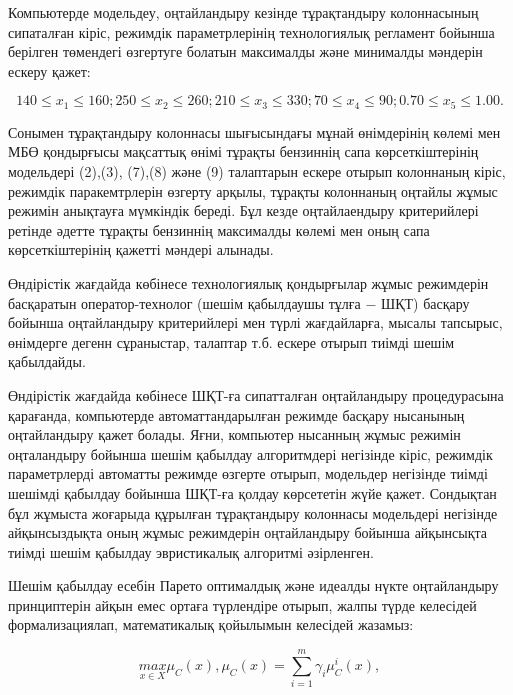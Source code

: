 \begin{multicols}{2}
Компьютерде модельдеу, оңтайландыру кезінде тұрақтандыру колоннасының
сипаталған кіріс, режимдік параметрлерінің технологиялық регламент
бойынша берілген төмендегі өзгертуге болатын максималды және минималды
мәндерін ескеру қажет:
\end{multicols}

\begin{equation}
140\leq x_1 \leq 160;250\leq x_2\leq 260;210\leq x_3\leq 330;70\leq x_4\leq 90;0.70\leq x_5\leq 1.00.
\end{equation}

\begin{multicols}{2}
Сонымен тұрақтандыру колоннасы шығысындағы мұнай өнімдерінің көлемі мен
МБӨ қондырғысы мақсаттық өнімі тұрақты бензиннің сапа көрсеткіштерінің
модельдері (2),(3), (7),(8) және (9) талаптарын ескере отырып колоннаның
кіріс, режимдік паракемтрлерін өзгерту арқылы, тұрақты колоннаның
оңтайлы жұмыс режимін анықтауға мүмкіндік береді. Бұл кезде
оңтайлаендыру критерийлері ретінде әдетте тұрақты бензиннің максималды
көлемі мен оның сапа көрсеткіштерінің қажетті мәндері алынады.

Өндірістік жағдайда көбінесе технологиялық қондырғылар жұмыс режимдерін
басқаратын оператор-технолог (шешім қабылдаушы тұлға − ШҚТ) басқару
бойынша оңтайландыру критерийлері мен түрлі жағдайларға, мысалы
тапсырыс, өнімдерге дегенн сұраныстар, талаптар т.б. ескере отырып
тиімді шешім қабылдайды.

Өндірістік жағдайда көбінесе ШҚТ-ға сипатталған оңтайландыру
процедурасына қарағанда, компьютерде автоматтандарылған режимде басқару
нысанының оңтайландыру қажет болады. Яғни, компьютер нысанның жұмыс
режимін оңталандыру бойынша шешім қабылдау алгоритмдері негізінде кіріс,
режимдік параметрлерді автоматты режимде өзгерте отырып, модельдер
негізінде тиімді шешімді қабылдау бойынша ШҚТ-ға қолдау көрсететін жүйе
қажет. Сондықтан бұл жұмыста жоғарыда құрылған тұрақтандыру колоннасы
модельдері негізінде айқынсыздықта оның жұмыс режимдерін оңтайландыру
бойынша айқынсықта тиімді шешім қабылдау эвристикалық алгоритмі
әзірленген.

Шешім қабылдау есебін Парето оптималдық және идеалды нүкте оңтайландыру
принциптерін айқын емес ортаға түрлендіре отырып, жалпы түрде келесідей
формализациялап, математикалық қойылымын келесідей жазамыз:
\end{multicols}

\begin{equation}
\underset{x\in X}{max}\mu_C(x),\mu_C(x)=\sum_{i=1}^m\gamma_i\mu_C^i(x),
\end{equation}

